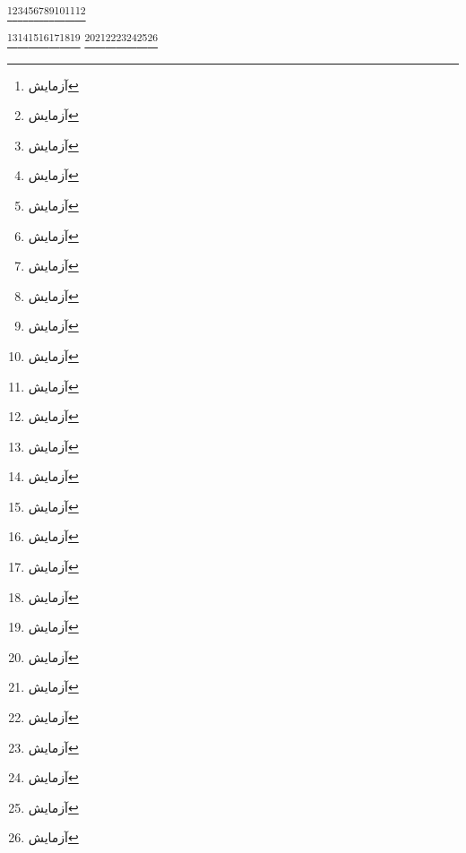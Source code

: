 \documentclass{article}
\begin{document}
\footnote{آزمایش}\footnote{آزمایش}\footnote{آزمایش}\footnote{آزمایش}\footnote{آزمایش}\footnote{آزمایش}\footnote{آزمایش}\footnote{آزمایش}\footnote{آزمایش}\footnote{آزمایش}\footnote{آزمایش}\footnote{آزمایش}

\bigskip
\begin{minipage}{\textwidth}
\footnote{آزمایش}\footnote{آزمایش}\footnote{آزمایش}\footnote{آزمایش}\footnote{آزمایش}\footnote{آزمایش}\footnote{آزمایش}%
\footnote{آزمایش}\footnote{آزمایش}\footnote{آزمایش}\footnote{آزمایش}\footnote{آزمایش}\footnote{آزمایش}\footnote{آزمایش}
\end{minipage}
\end{document}
